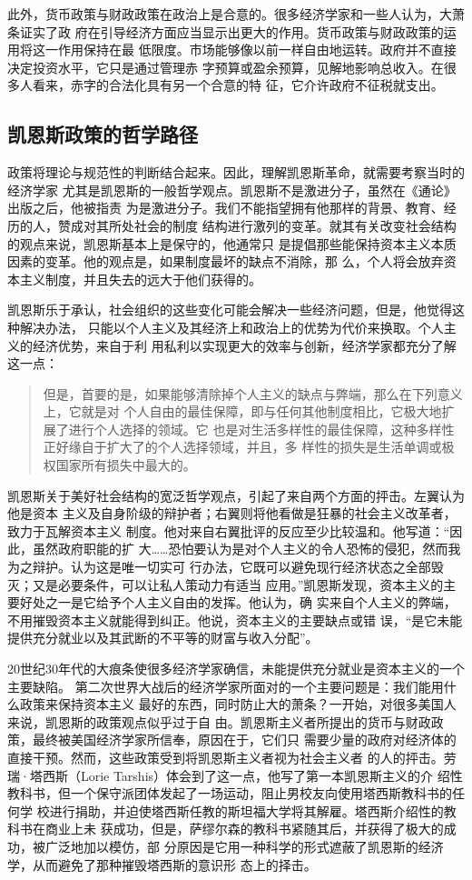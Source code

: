此外，货币政策与财政政策在政治上是合意的。很多经济学家和一些人认为，大萧条证实了政
府在引导经济方面应当显示出更大的作用。货币政策与财政政策的运用将这一作用保持在最
低限度。市场能够像以前一样自由地运转。政府并不直接决定投资水平，它只是通过管理赤
字预算或盈余预算，见解地影响总收入。在很多人看来，赤字的合法化具有另一个合意的特
征，它介许政府不征税就支出。

\subsection{凯恩斯政策的哲学路径}

政策将理论与规范性的判断结合起来。因此，理解凯恩斯革命，就需要考察当时的经济学家
尤其是凯恩斯的一般哲学观点。凯恩斯不是激进分子，虽然在《通论》出版之后，他被指责
为是激进分子。我们不能指望拥有他那样的背景、教育、经历的人，赞成对其所处社会的制度
结构进行激列的变革。就其有关改变社会结构的观点来说，凯恩斯基本上是保守的，他通常只
是提倡那些能保持资本主义本质因素的变革。他的观点是，如果制度最坏的缺点不消除，那
么，个人将会放弃资本主义制度，并且失去的远大于他们获得的。

凯恩斯乐于承认，社会组织的这些变化可能会解决一些经济问题，但是，他觉得这种解决办法，
只能以个人主义及其经济上和政治上的优势为代价来换取。个人主义的经济优势，来自于利
用私利以实现更大的效率与创新，经济学家都充分了解这一点：

\begin{quotation}
  但是，首要的是，如果能够清除掉个人主义的缺点与弊端，那么在下列意义上，它就是对
  个人自由的最佳保障，即与任何其他制度相比，它极大地扩展了进行个人选择的领域。它
  也是对生活多样性的最佳保障，这种多样性正好缘自于扩大了的个人选择领域，并且，多
  样性的损失是生活单调或极权国家所有损失中最大的。
\end{quotation}

凯恩斯关于美好社会结构的宽泛哲学观点，引起了来自两个方面的抨击。左翼认为他是资本
主义及自身阶级的辩护者；右翼则将他看做是狂暴的社会主义改革者，致力于瓦解资本主义
制度。他对来自右翼批评的反应至少比较温和。他写道：“因此，虽然政府职能的扩
大……恐怕要认为是对个人主义的令人恐怖的侵犯，然而我为之辩护。认为这是唯一切实可
行办法，它既可以避免现行经济状态之全部毁灭；又是必要条件，可以让私人策动力有适当
应用。”凯恩斯发现，资本主义的主要好处之一是它给予个人主义自由的发挥。他认为，确
实来自个人主义的弊端，不用摧毁资本主义就能得到纠正。他说，资本主义的主要缺点或错
误，“是它未能提供充分就业以及其武断的不平等的财富与收入分配”。

20世纪30年代的大痕条使很多经济学家确信，未能提供充分就业是资本主义的一个主要缺陷。
第二次世界大战后的经济学家所面对的一个主要问题是：我们能用什么政策来保持资本主义
最好的东西，同时防止大的萧条？一开始，对很多美国人来说，凯恩斯的政策观点似乎过于自
由。凯恩斯主义者所提出的货币与财政政策，最终被美国经济学家所信奉，原因在于，它们只
需要少量的政府对经济体的直接干预。然而，这些政策受到将凯恩斯主义者视为社会主义者
的人的抨击。劳瑞·塔西斯（Lorie Tarshis）体会到了这一点，他写了第一本凯恩斯主义的介
绍性教科书，但一个保守派团体发起了一场运动，阻止男校友向使用塔西斯教科书的任何学
校进行捐助，并迫使塔西斯任教的斯坦福大学将其解雇。塔西斯介绍性的教科书在商业上未
获成功，但是，萨缪尔森的教科书紧随其后，并获得了极大的成功，被广泛地加以模仿，部
分原因是它用一种科学的形式遮蔽了凯恩斯的经济学，从而避免了那种摧毁塔西斯的意识形
态上的择击。


